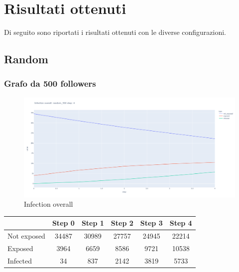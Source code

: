 \section{Risultati ottenuti}
Di seguito sono riportati i risultati ottenuti con le diverse configurazioni.
    \subsection{Random}
        \subsubsection{Grafo da 500 followers}
        
            \begin{figure}[H]
                \includegraphics[width=16cm]{resources/charts/random_500_line.png}
                \caption{Infection overall}
                \label{fig:random_500_line}
            \end{figure}
            
            \begin{table}[H]
                \centering
                \begin{tabular}{|l|c|c|c|c|c|}
                \hline
                            & Step 0 & Step 1 & Step 2 & Step 3 & Step 4 \\ \hline
                Not exposed & 34487  & 30989  & 27757  & 24945  & 22214  \\ \hline
                Exposed     & 3964   & 6659   & 8586   & 9721   & 10538  \\ \hline
                Infected    & 34     & 837    & 2142   & 3819   & 5733   \\ \hline
                \end{tabular}
            \end{table}
            
